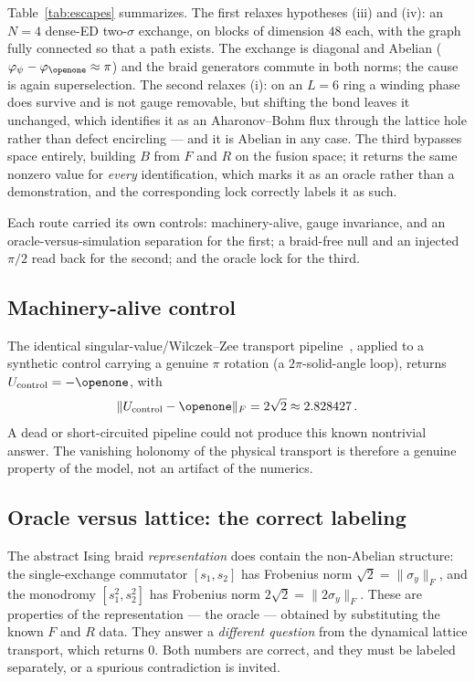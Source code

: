\documentclass[aps,pra,twocolumn,superscriptaddress,longbibliography,floatfix,nofootinbib]{revtex4-2}
\newcommand{\Id}{\openone}
\newcommand{\Fnorm}[1]{\lVert #1 \rVert_{F}}
\begin{document}
Table~\ref{tab:escapes} summarizes. The first relaxes hypotheses (iii) and
(iv): an $N=4$ dense-ED two-$\sigma$ exchange, on blocks of dimension $48$
each, with the graph fully connected so that a path exists. The exchange is
diagonal and Abelian ($\varphi_\psi-\varphi_{\Id}\approx\pi$) and the braid
generators commute in both norms; the cause is again superselection. The second
relaxes (i): on an $L=6$ ring a winding phase does survive and is not gauge
removable, but shifting the bond leaves it unchanged, which identifies it as an
Aharonov--Bohm flux through the lattice hole rather than defect encircling ---
and it is Abelian in any case. The third bypasses space entirely, building $B$
from $F$ and $R$ on the fusion space; it returns the same nonzero value for
\emph{every} identification, which marks it as an oracle rather than a
demonstration, and the corresponding lock correctly labels it as such.

Each route carried its own controls: machinery-alive, gauge invariance, and an
oracle-versus-simulation separation for the first; a braid-free null and an
injected $\pi/2$ read back for the second; and the oracle lock for the third.

\subsection{Machinery-alive control}
\label{sec:machinery}

The identical singular-value/Wilczek--Zee transport
pipeline~\cite{WilczekZee1984}, applied to a synthetic control carrying a
genuine $\pi$ rotation (a $2\pi$-solid-angle loop), returns
$U_{\mathrm{control}}=-\Id$, with
\begin{equation}
  \Fnorm{U_{\mathrm{control}}-\Id} = 2\sqrt2 \approx 2.828427\,.
  \label{eq:alive}
\end{equation}
A dead or short-circuited pipeline could not produce this known nontrivial
answer. The vanishing holonomy of the physical transport is therefore a genuine
property of the model, not an artifact of the numerics.

\subsection{Oracle versus lattice: the correct labeling}
\label{sec:oracle}

The abstract Ising braid \emph{representation} does contain the non-Abelian
structure: the single-exchange commutator $[s_1,s_2]$ has Frobenius norm
$\sqrt2=\Fnorm{\sigma_y}$, and the monodromy $[s_1^{2},s_2^{2}]$ has
Frobenius norm $2\sqrt2=\Fnorm{2\sigma_y}$. These are properties of the
representation --- the oracle --- obtained by substituting the known $F$ and
$R$ data. They answer a \emph{different question} from the dynamical lattice
transport, which returns $0$. Both numbers are correct, and they must be
labeled separately, or a spurious contradiction is invited.
\end{document}
